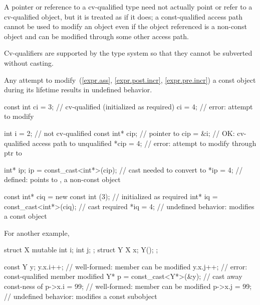 \pnum
A pointer or reference to a cv-qualified type need not actually point or
refer to a cv-qualified object, but it is treated as if it does; a
const-qualified access path cannot be used to modify an object even if
the object referenced is a non-const object and can be modified through
some other access path.
\begin{note}
Cv-qualifiers are supported by the type system so that they cannot be
subverted without casting.
\end{note}

\pnum
{}%
Any attempt to modify~(\ref{expr.ass},
\ref{expr.post.incr}, \ref{expr.pre.incr}) a
const object during its
lifetime results in undefined behavior.
\begin{example}
\begin{codeblock}
const int ci = 3;                       // cv-qualified (initialized as required)
ci = 4;                                 // error: attempt to modify 

int i = 2;                              // not cv-qualified
const int* cip;                         // pointer to 
cip = &i;                               // OK: cv-qualified access path to unqualified
*cip = 4;                               // error: attempt to modify through ptr to 

int* ip;
ip = const_cast<int*>(cip);             // cast needed to convert  to 
*ip = 4;                                // defined:  points to , a non-const object

const int* ciq = new const int (3);     // initialized as required
int* iq = const_cast<int*>(ciq);        // cast required
*iq = 4;                                // undefined behavior: modifies a const object
\end{codeblock}
For another example,
\begin{codeblock}
struct X {
  mutable int i;
  int j;
};
struct Y {
  X x;
  Y();
};

const Y y;
y.x.i++;                                // well-formed:  member can be modified
y.x.j++;                                // error: const-qualified member modified
Y* p = const_cast<Y*>(&y);              // cast away const-ness of 
p->x.i = 99;                            // well-formed:  member can be modified
p->x.j = 99;                            // undefined behavior: modifies a const subobject
\end{codeblock}
\end{example}

